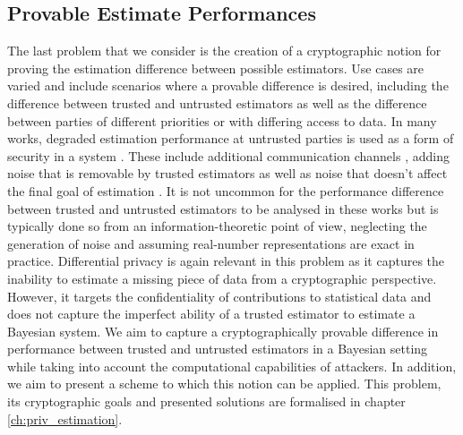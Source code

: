 % 
% 

\subsection{Provable Estimate Performances}\label{subsec:intro:provable_est_perf}
The last problem that we consider is the creation of a cryptographic notion for proving the estimation difference between possible estimators. Use cases are varied and include scenarios where a provable difference is desired, including the difference between trusted and untrusted estimators as well as the difference between parties of different priorities or with differing access to data. In many works, degraded estimation performance at untrusted parties is used as a form of security in a system \cite{specialePrivacyPreservingImageBased2019,liPrivacyPreservingDistributedOptimization2020,leongTransmissionSchedulingRemote2019,leongInformationBoundsState2019,grovesPrinciplesGNSSInertial2015}. These include additional communication channels \cite{leongInformationBoundsState2019,grovesPrinciplesGNSSInertial2015}, adding noise that is removable by trusted estimators \cite{murguiaInformationTheoreticPrivacyChaos2020,leongUseArtificialNoise2018} as well as noise that doesn't affect the final goal of estimation \cite{liPrivacyPreservingDistributedOptimization2020}. It is not uncommon for the performance difference between trusted and untrusted estimators to be analysed in these works \cite{hePreservingDataPrivacyAdded2018,murguiaInformationTheoreticPrivacyChaos2020,sinopoliKalmanFilteringIntermittent2004,mishraSecureStateEstimation2015} but is typically done so from an information-theoretic point of view, neglecting the generation of noise and assuming real-number representations are exact in practice. Differential privacy \cite{dworkDifferentialPrivacySurvey2008} is again relevant in this problem as it captures the inability to estimate a missing piece of data from a cryptographic perspective. However, it targets the confidentiality of contributions to statistical data and does not capture the imperfect ability of a trusted estimator to estimate a Bayesian system. We aim to capture a cryptographically provable difference in performance between trusted and untrusted estimators in a Bayesian setting while taking into account the computational capabilities of attackers. In addition, we aim to present a scheme to which this notion can be applied. This problem, its cryptographic goals and presented solutions are formalised in chapter \ref{ch:priv_estimation}.

